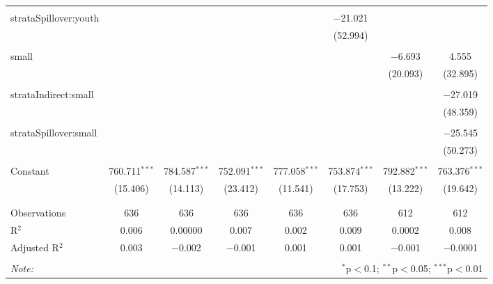 \begin{sidewaystable}[!htbp]
\begin{tabular}{@{\extracolsep{15pt}}lccccccc}
  & & & & & & & \\ 
 strataSpillover:youth &  &  &  &  & $-$21.021 &  &  \\ 
  &  &  &  &  & (52.994) &  &  \\ 
  & & & & & & & \\ 
 small &  &  &  &  &  & $-$6.693 & 4.555 \\ 
  &  &  &  &  &  & (20.093) & (32.895) \\ 
  & & & & & & & \\ 
 strataIndirect:small &  &  &  &  &  &  & $-$27.019 \\ 
  &  &  &  &  &  &  & (48.359) \\ 
  & & & & & & & \\ 
 strataSpillover:small &  &  &  &  &  &  & $-$25.545 \\ 
  &  &  &  &  &  &  & (50.273) \\ 
  & & & & & & & \\ 
 Constant & 760.711$^{***}$ & 784.587$^{***}$ & 752.091$^{***}$ & 777.058$^{***}$ & 753.874$^{***}$ & 792.882$^{***}$ & 763.376$^{***}$ \\ 
  & (15.406) & (14.113) & (23.412) & (11.541) & (17.753) & (13.222) & (19.642) \\ 
  & & & & & & & \\ 
\hline \\[-1.8ex] 
Observations & 636 & 636 & 636 & 636 & 636 & 612 & 612 \\ 
R$^{2}$ & 0.006 & 0.00000 & 0.007 & 0.002 & 0.009 & 0.0002 & 0.008 \\ 
Adjusted R$^{2}$ & 0.003 & $-$0.002 & $-$0.001 & 0.001 & 0.001 & $-$0.001 & $-$0.0001 \\ 
\hline 
\hline \\[-1.8ex] 
\textit{Note:}  & \multicolumn{7}{r}{$^{*}$p$<$0.1; $^{**}$p$<$0.05; $^{***}$p$<$0.01} \\ 
\end{tabular} 
\end{sidewaystable}  
